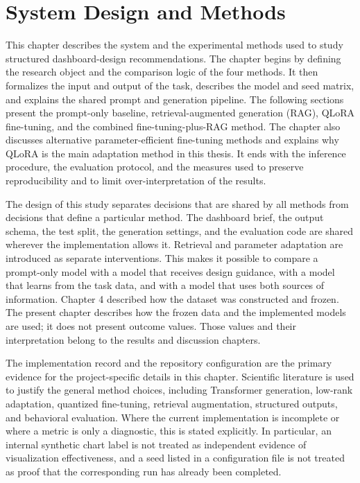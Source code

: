 \chapter{System Design and Methods}

This chapter describes the system and the experimental methods used to study structured dashboard-design recommendations. The chapter begins by defining the research object and the comparison logic of the four methods. It then formalizes the input and output of the task, describes the model and seed matrix, and explains the shared prompt and generation pipeline. The following sections present the prompt-only baseline, retrieval-augmented generation (RAG), QLoRA fine-tuning, and the combined fine-tuning-plus-RAG method. The chapter also discusses alternative parameter-efficient fine-tuning methods and explains why QLoRA is the main adaptation method in this thesis. It ends with the inference procedure, the evaluation protocol, and the measures used to preserve reproducibility and to limit over-interpretation of the results.

The design of this study separates decisions that are shared by all methods from decisions that define a particular method. The dashboard brief, the output schema, the test split, the generation settings, and the evaluation code are shared wherever the implementation allows it. Retrieval and parameter adaptation are introduced as separate interventions. This makes it possible to compare a prompt-only model with a model that receives design guidance, with a model that learns from the task data, and with a model that uses both sources of information. Chapter 4 described how the dataset was constructed and frozen. The present chapter describes how the frozen data and the implemented models are used; it does not present outcome values. Those values and their interpretation belong to the results and discussion chapters.

The implementation record and the repository configuration are the primary evidence for the project-specific details in this chapter. Scientific literature is used to justify the general method choices, including Transformer generation, low-rank adaptation, quantized fine-tuning, retrieval augmentation, structured outputs, and behavioral evaluation. Where the current implementation is incomplete or where a metric is only a diagnostic, this is stated explicitly. In particular, an internal synthetic chart label is not treated as independent evidence of visualization effectiveness, and a seed listed in a configuration file is not treated as proof that the corresponding run has already been completed.

